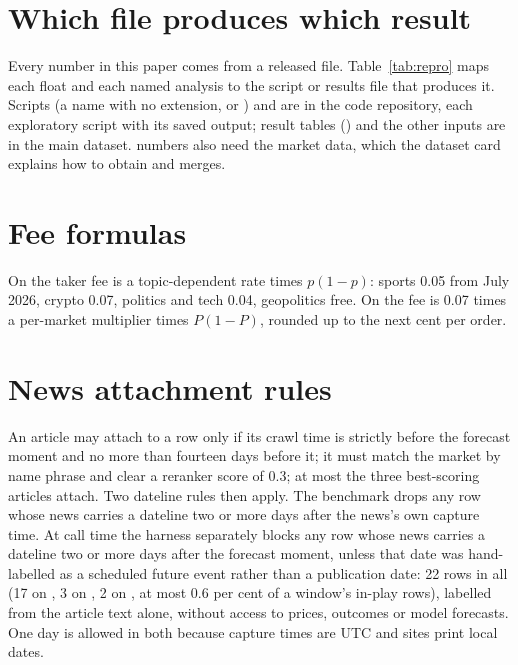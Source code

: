 \section{Which file produces which result}
\label{app:repro}
Every number in this paper comes from a released file. Table~\ref{tab:repro}
maps each float and each named analysis to the script or results file that
produces it. Scripts (a name with no extension, or ) and
 are in the code repository, each exploratory script with its
saved output; result tables () and the other  inputs are
in the main dataset. \winC numbers also need the \kalshi market data, which the
dataset card explains how to obtain and  merges.

\begin{table}[!tbp]
\centering
\caption{Where each result comes from.}
\label{tab:repro}

\end{table}

\section{Fee formulas}
\label{app:feeformula}
On \polymarket the taker fee is a topic-dependent rate times $p(1-p)$: sports
0.05 from July 2026, crypto 0.07, politics and tech 0.04, geopolitics free. On
\kalshi the fee is 0.07 times a per-market multiplier times $P(1-P)$, rounded
up to the next cent per order.

\section{News attachment rules}
\label{app:newsattach}
An article may attach to a row only if its crawl time is strictly before the
forecast moment and no more than fourteen days before it; it must match the
market by name phrase and clear a reranker score of 0.3; at most the three
best-scoring articles attach. Two dateline rules then apply. The benchmark drops
any row whose news carries a dateline two or more days after the news's own
capture time. At call time the harness separately blocks any row whose news
carries a dateline two or more days after the forecast moment, unless that date
was hand-labelled as a scheduled future event rather than a publication date:
22 rows in all (17 on \winA, 3 on \winB, 2 on \winC, at most 0.6 per cent of a
window's in-play rows), labelled from the article text alone, without access to prices, outcomes or model
forecasts.
One day is allowed in both because capture times are UTC and sites print local
dates.

